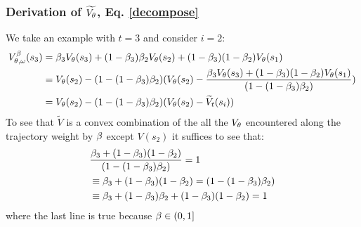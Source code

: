 \subsubsection{Derivation of $\widetilde{V_{\theta}}$, Eq. \ref{decompose}}\label{decompose_app}
We take an example with $t=3$ and consider $i=2$:
\begin{equation}
    \begin{split}
        V^{\beta}_{\theta, \omega}(s_3) &= \beta_3 V_{\theta}(s_3) + (1-\beta_3)\beta_2 V_{\theta}(s_2) + (1-\beta_3)(1-\beta_2)  V_{\theta}(s_1)\\
        &= V_{\theta}(s_2) - (1-(1-\beta_3)\beta_2)(V_{\theta}(s_2) - \frac{\beta_3 V_{\theta}(s_3) + (1-\beta_3)(1-\beta_2)  V_{\theta}(s_1)}{(1-(1-\beta_3)\beta_2)})\\
        &= V_{\theta}(s_2) - (1-(1-\beta_3)\beta_2)(V_{\theta}(s_2) - \widetilde{V}_t(s_i))
    \end{split}
\end{equation}
To see that $\widetilde{V}$ is a convex combination of the all the $V_{\theta}$ encountered along the trajectory weight by $\beta$ except $V(s_2)$ it suffices to see that:
\begin{equation}
    \begin{split}
        & \frac{\beta_3  + (1-\beta_3)(1-\beta_2)  }{(1-(1-\beta_3)\beta_2)} = 1 \\
        &\equiv \beta_3  + (1-\beta_3)(1-\beta_2)  = (1-(1-\beta_3)\beta_2) \\
        &\equiv \beta_3 + (1-\beta_3)\beta_2 + (1-\beta_3)(1-\beta_2) = 1
    \end{split}
\end{equation}
where the last line is true because $\beta \in (0,1]$
